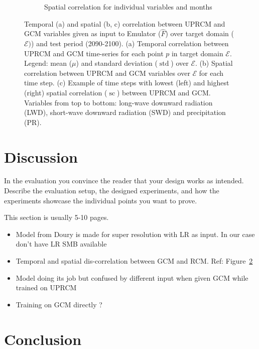 \documentclass[a4paper,11pt,oneside]{report}
\begin{document}
\begin{figure}[tbp]
\begin{subfigure}[b]{\columnwidth}
            \caption[]%
            {{\small Spatial correlation for individual variables and months}}  \label{fig:spatial-corr-GCM-RCM-ex}
        \end{subfigure}
        \hfill
        \caption[]
        {\small Temporal (a) and spatial (b, c) correlation between UPRCM and GCM variables given as input to Emulator ($\hat{F}$) over target domain ($\mathcal{E})$) and test period (2090-2100). (a) Temporal correlation between UPRCM and GCM time-series for each point $p$ in target domain $\mathcal{E}$. Legend: mean ($\mu$) and standard deviation ($\operatorname{std}$) over $\mathcal{E}$. (b) Spatial correlation between UPRCM and GCM variables over $\mathcal{E}$ for each time step. (c) Example of time steps with lowest (left) and highest (right) spatial correlation ($\operatorname{sc}$) between UPRCM and GCM. Variables from top to bottom: long-wave downward radiation (LWD), short-wave downward radiation (SWD) and precipitation (PR).} 
        \label{fig:corr-GCM-RCM}
    \end{figure}


\chapter{Discussion}

In the evaluation you convince the reader that your design works as intended.
Describe the evaluation setup, the designed experiments, and how the
experiments showcase the individual points you want to prove.

This section is usually 5-10 pages.

\begin{itemize}
    \item Model from Doury is made for super resolution with LR as input. In our case don't have LR SMB available
    \item Temporal and spatial dis-correlation between GCM and RCM. Ref: Figure~\ref{fig:corr-GCM-RCM}
    \item Model doing its job but confused by different input when given GCM while trained on UPRCM
    \item Training on GCM directly ?
\end{itemize}



\chapter{Conclusion}
\end{document}
